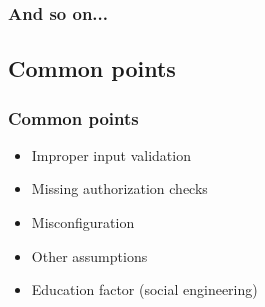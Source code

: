 
\begin{frame}
\frametitle{And so on...}
\end{frame}

\subsection{Common points}

\begin{frame}
\frametitle{Common points}
\pause
\begin{itemize}
\item<2-6> Improper input validation
\item<3-6> Missing authorization checks
\item<4-6> Misconfiguration
\item<5-6> Other assumptions
\item<6-6> Education factor {\small (social engineering)}
\end{itemize}
\end{frame}

